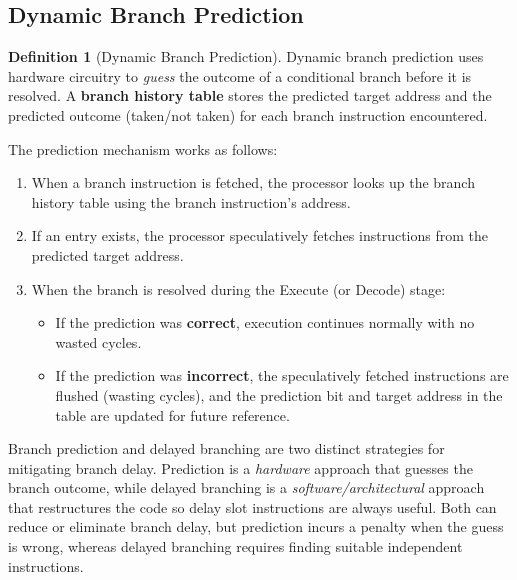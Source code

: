 \documentclass[11pt, a4paper, notitlepage]{report}
\theoremstyle{definition}
\newtheorem{definition}[theorem]{Definition}
\theoremstyle{remark}
\theoremstyle{definition}
\begin{document}
\subsection{Dynamic Branch Prediction}
\label{sec:branch-prediction}

\begin{definition}[Dynamic Branch Prediction]
\label{def:branch-prediction}
  Dynamic branch prediction uses hardware circuitry to \emph{guess} the outcome of a conditional branch before it is resolved. A \textbf{branch history table} stores the predicted target address and the predicted outcome (taken/not taken) for each branch instruction encountered.
\end{definition}

The prediction mechanism works as follows:

\begin{enumerate}
  \item When a branch instruction is fetched, the processor looks up the branch history table using the branch instruction's address.
  \item If an entry exists, the processor speculatively fetches instructions from the predicted target address.
  \item When the branch is resolved during the Execute (or Decode) stage:
    \begin{itemize}
      \item If the prediction was \textbf{correct}, execution continues normally with no wasted cycles.
      \item If the prediction was \textbf{incorrect}, the speculatively fetched instructions are flushed (wasting cycles), and the prediction bit and target address in the table are updated for future reference.
    \end{itemize}
\end{enumerate}

\begin{examtip}[title={Exam Tip: Branch Prediction vs.\ Delayed Branching}]
  Branch prediction and delayed branching are two distinct strategies for mitigating branch delay. Prediction is a \emph{hardware} approach that guesses the branch outcome, while delayed branching is a \emph{software/architectural} approach that restructures the code so delay slot instructions are always useful. Both can reduce or eliminate branch delay, but prediction incurs a penalty when the guess is wrong, whereas delayed branching requires finding suitable independent instructions.
\end{examtip}
\end{document}
